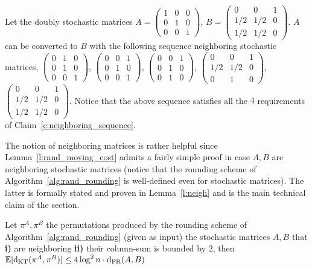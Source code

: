 \begin{example}
Let the doubly stochastic matrices $A = 
\begin{pmatrix}
1 & 0 & 0 \\
0 & 1 & 0 \\
0 & 0 & 1
\end{pmatrix}$, $B = 
\begin{pmatrix}
0 & 0 & 1 \\
1/2 & 1/2 & 0 \\
1/2 & 1/2 & 0
\end{pmatrix}$. $A$ can be converted to $B$ with the following sequence neighboring stochastic matrices, 
\smallskip
$\begin{pmatrix}
0 & 1 & 0 \\
0 & 1 & 0 \\
0 & 0 & 1
\end{pmatrix}$,
$\begin{pmatrix}
0 & 0 & 1 \\
0 & 1 & 0 \\
0 & 0 & 1
\end{pmatrix}$,
$\begin{pmatrix}
0 & 0 & 1 \\
0 & 1 & 0 \\
0 & 1 & 0
\end{pmatrix}$,
$\begin{pmatrix}
0 & 0 & 1 \\
1/2 & 1/2 & 0 \\
0 & 1 & 0
\end{pmatrix}$,
$\begin{pmatrix}
0 & 0 & 1 \\
1/2 & 1/2 & 0 \\
1/2 & 1/2 & 0
\end{pmatrix}$.
\smallskip
Notice that the above sequence satisfies all the $4$ requirements of Claim~\ref{c:neighboring_sequence}.
\end{example}


\noindent The notion of neighboring matrices is rather helpful since Lemma~\ref{l:rand_moving_cost} admits a fairly simple proof in case $A,B$ are neighboring stochastic matrices (notice
that the rounding scheme of
Algorithm~\ref{alg:rand_rounding} is well-defined even for stochastic matrices). The latter is formally stated and proven in Lemma~\ref{l:neigh} and is the main technical claim of the section.

\begin{lemma}\label{l:neigh}
Let $\pi^A,\pi^B$ the permutations produced by the rounding scheme of
Algorithm~\ref{alg:rand_rounding} (given as input) the stochastic matrices $A,B$ that 
\textbf{i)} are neighboring \textbf{ii)} their column-sum is bounded by $2$, then
$\mathbb E[\mathrm{d}_{\mathrm{KT}}(\pi^A,\pi^B)] \leq 4 \log^2 n \cdot \mathrm{d}_{\mathrm{FR}}(A,B)$
\end{lemma}

